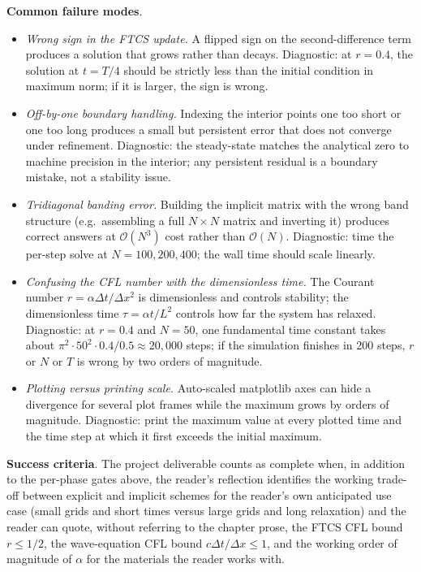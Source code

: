 \begin{project}
\textbf{Common failure modes}.

\begin{itemize}[leftmargin=*]
  \item \emph{Wrong sign in the FTCS update.} A flipped sign on
    the second-difference term produces a solution that grows
    rather than decays. Diagnostic: at $r = 0.4$, the solution at
    $t = T/4$ should be strictly less than the initial condition
    in maximum norm; if it is larger, the sign is wrong.
  \item \emph{Off-by-one boundary handling.} Indexing the interior
    points one too short or one too long produces a small but
    persistent error that does not converge under refinement.
    Diagnostic: the steady-state matches the analytical zero to
    machine precision in the interior; any persistent residual is
    a boundary mistake, not a stability issue.
  \item \emph{Tridiagonal banding error.} Building the implicit
    matrix with the wrong band structure (e.g.\ assembling a
    full $N \times N$ matrix and inverting it) produces correct
    answers at $\mathcal{O}(N^{3})$ cost rather than $\mathcal{O}
    (N)$. Diagnostic: time the per-step solve at $N = 100, 200,
    400$; the wall time should scale linearly.
  \item \emph{Confusing the CFL number with the dimensionless
    time.} The Courant number $r = \alpha \Delta t / \Delta x^{2}$
    is dimensionless and controls stability; the dimensionless
    time $\tau = \alpha t / L^{2}$ controls how far the system has
    relaxed. Diagnostic: at $r = 0.4$ and $N = 50$, one
    fundamental time constant takes about $\pi^{2} \cdot 50^{2}
    \cdot 0.4 / 0.5 \approx 20{,}000$ steps; if the simulation
    finishes in 200 steps, $r$ or $N$ or $T$ is wrong by two
    orders of magnitude.
  \item \emph{Plotting versus printing scale.} Auto-scaled
    matplotlib axes can hide a divergence for several plot frames
    while the maximum grows by orders of magnitude. Diagnostic:
    print the maximum value at every plotted time and the time
    step at which it first exceeds the initial maximum.
\end{itemize}

\textbf{Success criteria}. The project deliverable counts as
complete when, in addition to the per-phase gates above, the
reader's reflection identifies the working trade-off between
explicit and implicit schemes for the reader's own anticipated
use case (small grids and short times versus large grids and long
relaxation) and the reader can quote, without referring to the
chapter prose, the FTCS CFL bound $r \leq 1/2$, the wave-equation
CFL bound $c \Delta t / \Delta x \leq 1$, and the working order
of magnitude of $\alpha$ for the materials the reader works with.
\end{project}


